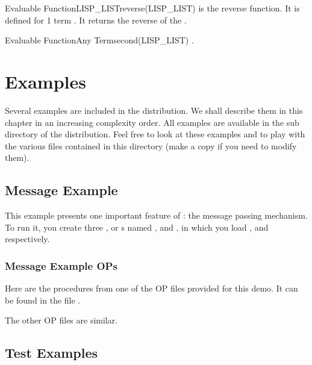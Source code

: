 \begin{typeefa}{Evaluable Function}{LISP\_LIST}{reverse}{(LISP\_LIST)}
is the reverse function. It is defined for 1 term . It returns the
reverse of the .
\end{typeefa}

\begin{typeefa}{Evaluable Function}{Any Term}{second}{(LISP\_LIST)}
.
\end{typeefa}


\chapter{Examples}

Several examples are included in the \COPRS{} distribution.  We shall describe
them in this chapter in an increasing complexity order. All examples are
available in the  sub directory of the \COPRSDE{} distribution. Feel
free to look at these examples and to play with the various files contained in
this directory (make a copy if you need to modify them).



\section{Message Example}

This example presents one important feature of \COPRS: the message
passing mechanism. To run it, you create three \COPRS{}, or \XPK{}s named
,  and , in which you load
,  and 
respectively.



\subsection{Message Example OPs}

Here are the procedures from one of the OP files provided for this demo.  It
can be found in the file .



The other OP files are similar.

\section{Test Examples}

